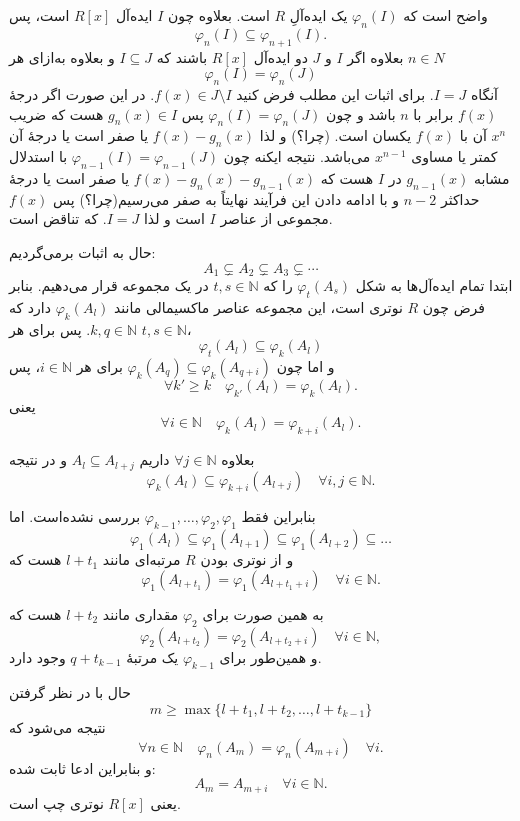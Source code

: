 واضح است که $\varphi_n(I)$ یک ایده‌آلِ $R$ است.
بعلاوه چون
$I$
ایده‌آل
$R[x]$
است، پس
\[
    \varphi_n(I) \subseteq \varphi_{n+1}(I).
\]
بعلاوه اگر
\(I\)
و
\(J\)
دو ایده‌آل
$R[x]$
باشند که
\(I \subseteq J\)
و بعلاوه به‌ازای هر
\(n \in N\)
\[
    \varphi_n(I) = \varphi_n(J)
\]
آنگاه
\(I = J\).
برای اثبات
این مطلب فرض کنید
\(f(x) \in J \setminus I\).
در این صورت اگر درجهٔ
\(f(x)\)
برابر با
\(n\)
باشد و چون
\(\varphi_n(I) = \varphi_n(J)\)
پس
\(g_n(x) \in I\)
هست که ضریب
\(x^n\)
آن با
\(f(x)\)
یکسان است. (چرا؟) و لذا
\(f(x) - g_n(x)\)
یا صفر است یا درجهٔ آن کمتر یا مساوی
\(x^{n-1}\)
می‌باشد. نتیجه ایکنه چون
\(\varphi_{n-1}(I) = \varphi_{n-1}(J)\)
با استدلال مشابه
\(g_{n-1}(x)\)
در
\(I\)
هست که
\(f(x) - g_n(x) - g_{n-1}(x)\)
یا صفر است یا درجهٔ حداکثر
\(n-2\)
و با ادامه دادن این فرآیند نهایتاً به صفر می‌رسیم(چرا؟) پس
\(f(x)\)
مجموعی از عناصر
\(I\)
است و لذا
\(I = J\). که تناقض است.



حال به اثبات برمی‌گردیم:
\[
    A_1 \subsetneq A_2 \subsetneq A_3 \subsetneq \cdots
\]
ابتدا تمام ایده‌آل‌ها به شکل $\varphi_t(A_s)$ را که $t,s \in \mathbb{N}$ در یک مجموعه قرار می‌دهیم. بنابر فرض چون $R$ نوتری است، این مجموعه عناصر ماکسیمالی مانند $\varphi_k(A_l)$ دارد که $k,q \in \mathbb{N}$. پس برای هر $t,s \in \mathbb{N}$،
\[
    \varphi_t(A_l) \subseteq \varphi_k(A_l)
\]
و اما چون $\varphi_k(A_q) \subseteq \varphi_k(A_{q+i})$ برای هر $i \in \mathbb{N}$، پس
\[
    \forall k' \geq k \quad \varphi_{k'}(A_l) = \varphi_k(A_l).
\]
یعنی
\[
    \forall i \in \mathbb{N} \quad \varphi_k(A_l) = \varphi_{k+i}(A_l).
\]

بعلاوه $\forall j \in \mathbb{N}$ داریم $A_l \subseteq A_{l+j}$ و در نتیجه
\[
    \varphi_{k}(A_l) \subseteq \varphi_{k+i}(A_{l+j}) \quad \forall i,j \in \mathbb{N}.
\]


بنابراین فقط
$\varphi_{k-1},  \dots, \varphi_2, \varphi_{1}$
بررسی نشده‌است.
اما
\[
    \varphi_1(A_l) \subseteq \varphi_1(A_{l+1}) \subseteq \varphi_1(A_{l+2}) \subseteq \dots
\]
و از نوتری بودن $R$ مرتبه‌ای مانند $l+t_1$ هست که
\[
    \varphi_1(A_{l+t_1}) = \varphi_1(A_{l+t_1+i}) \quad \forall i \in \mathbb{N}.
\]

به همین صورت برای $\varphi_2$ مقداری مانند $l+t_2$ هست که
\[
    \varphi_2(A_{l+t_2}) = \varphi_2(A_{l+t_2+i}) \quad \forall i \in \mathbb{N},
\]
و همین‌طور برای $\varphi_{k-1}$ یک مرتبهٔ $q+t_{k-1}$ وجود دارد.

حال با در نظر گرفتن
\[
    m \geq \max \{  l+t_1, l+t_2, \dots, l+t_{k-1} \}
\]
نتیجه می‌شود که
\[
    \forall n \in \mathbb{N} \quad \varphi_n(A_m) = \varphi_n(A_{m+i}) \quad \forall i.
\]
و بنابراین ادعا ثابت شده:
\[
    A_m = A_{m+i} \quad \forall i \in \mathbb{N}.
\]
یعنی $R[x]$ نوتری چپ است.

